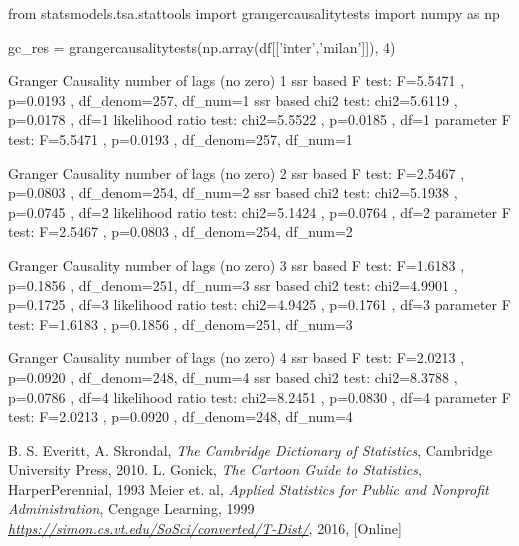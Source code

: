 \begin{ipython}
from statsmodels.tsa.stattools import grangercausalitytests
import numpy as np

gc_res = grangercausalitytests(np.array(df[['inter','milan']]), 4)	
\end{ipython}
\begin{ioutput}
Granger Causality
number of lags (no zero) 1
ssr based F test:         F=5.5471  , p=0.0193  , df_denom=257, df_num=1
ssr based chi2 test:   chi2=5.6119  , p=0.0178  , df=1
likelihood ratio test: chi2=5.5522  , p=0.0185  , df=1
parameter F test:         F=5.5471  , p=0.0193  , df_denom=257, df_num=1

Granger Causality
number of lags (no zero) 2
ssr based F test:         F=2.5467  , p=0.0803  , df_denom=254, df_num=2
ssr based chi2 test:   chi2=5.1938  , p=0.0745  , df=2
likelihood ratio test: chi2=5.1424  , p=0.0764  , df=2
parameter F test:         F=2.5467  , p=0.0803  , df_denom=254, df_num=2

Granger Causality
number of lags (no zero) 3
ssr based F test:         F=1.6183  , p=0.1856  , df_denom=251, df_num=3
ssr based chi2 test:   chi2=4.9901  , p=0.1725  , df=3
likelihood ratio test: chi2=4.9425  , p=0.1761  , df=3
parameter F test:         F=1.6183  , p=0.1856  , df_denom=251, df_num=3

Granger Causality
number of lags (no zero) 4
ssr based F test:         F=2.0213  , p=0.0920  , df_denom=248, df_num=4
ssr based chi2 test:   chi2=8.3788  , p=0.0786  , df=4
likelihood ratio test: chi2=8.2451  , p=0.0830  , df=4
parameter F test:         F=2.0213  , p=0.0920  , df_denom=248, df_num=4
\end{ioutput}

\begin{thebibliography}{9}
 B. S. Everitt, A. Skrondal, \emph{The Cambridge
	Dictionary of Statistics}, Cambridge University Press, 2010. 
 L. Gonick, \emph{The Cartoon Guide to Statistics}, HarperPerennial, 1993
 Meier et. al, \emph{Applied Statistics for Public and Nonprofit Administration}, Cengage Learning, 1999
 \href{}{\emph{https://simon.cs.vt.edu/SoSci/converted/T-Dist/}}, 2016, [Online]
\end{thebibliography}
